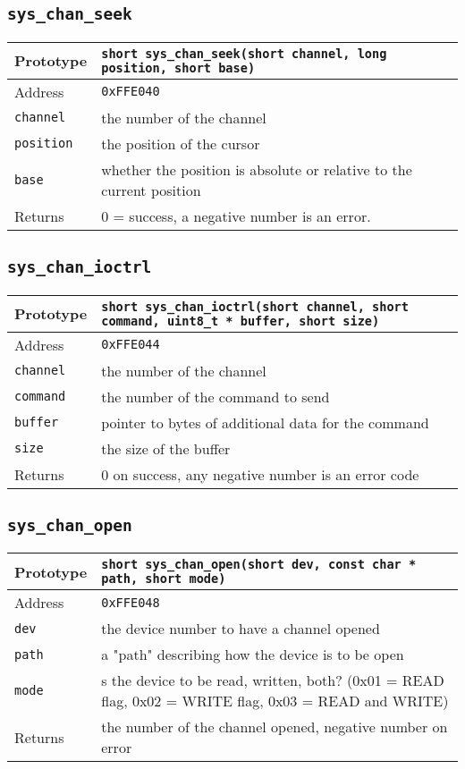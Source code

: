 \subsection*{\texttt{sys\_chan\_seek}}
\begin{tabular}{|l||l|} \hline
Prototype & \lstinline!short sys_chan_seek(short channel, long position, short base)! \\ \hline
Address & \texttt{0xFFE040} \\ \hline
\lstinline!channel! & the number of the channel \\ \hline
\lstinline!position! & the position of the cursor \\ \hline
\lstinline!base! & whether the position is absolute or relative to the current position \\ \hline
Returns & 0 = success, a negative number is an error. \\ \hline
\end{tabular}

\subsection*{\texttt{sys\_chan\_ioctrl}}
\begin{tabular}{|l||l|} \hline
Prototype & \lstinline!short sys_chan_ioctrl(short channel, short command, uint8_t * buffer, short size)! \\ \hline
Address & \texttt{0xFFE044} \\ \hline
\lstinline!channel! & the number of the channel \\ \hline
\lstinline!command! & the number of the command to send \\ \hline
\lstinline!buffer! & pointer to bytes of additional data for the command \\ \hline
\lstinline!size! & the size of the buffer \\ \hline
Returns & 0 on success, any negative number is an error code \\ \hline
\end{tabular}

\subsection*{\texttt{sys\_chan\_open}}
\begin{tabular}{|l||l|} \hline
Prototype & \lstinline!short sys_chan_open(short dev, const char * path, short mode)! \\ \hline
Address & \texttt{0xFFE048} \\ \hline
\lstinline!dev! & the device number to have a channel opened \\ \hline
\lstinline!path! & a "path" describing how the device is to be open \\ \hline
\lstinline!mode! & s the device to be read, written, both? (0x01 = READ flag, 0x02 = WRITE flag, 0x03 = READ and WRITE) \\ \hline
Returns & the number of the channel opened, negative number on error \\ \hline
\end{tabular}

